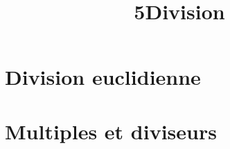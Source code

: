 \documentclass[12pt,a4paper]{article}
\date{}
\title{\textcircled{{\normalsize{5}}}Division}
\begin{document}
\maketitle








\section{Division euclidienne}






\section{Multiples et diviseurs}





\newpage



%
\end{document}
